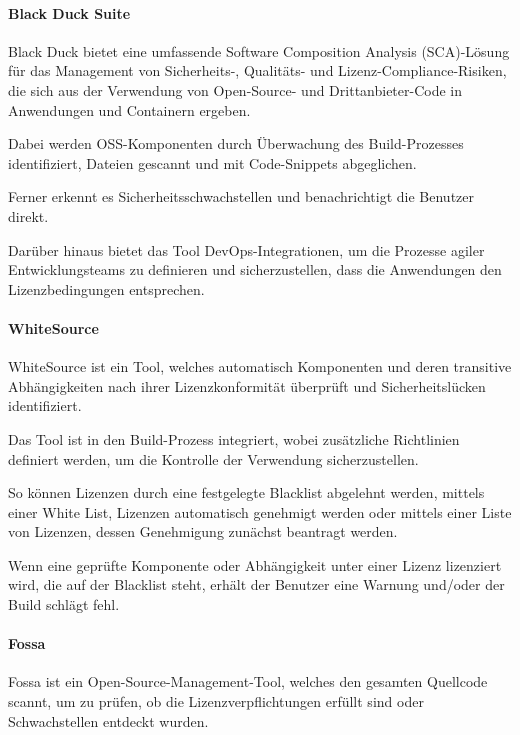 \paragraph{Black Duck Suite}

Black Duck bietet eine umfassende Software Composition Analysis (SCA)-Lösung für das Management von Sicherheits-, Qualitäts- und Lizenz-Compliance-Risiken, die sich aus der Verwendung von Open-Source- und Drittanbieter-Code in Anwendungen und Containern ergeben. \cite{}

Dabei werden OSS-Komponenten durch Überwachung des Build-Prozesses identifiziert, Dateien gescannt und mit Code-Snippets abgeglichen. 

Ferner erkennt es Sicherheitsschwachstellen und benachrichtigt die Benutzer direkt. 

Darüber hinaus bietet das Tool DevOps-Integrationen, um die Prozesse agiler Entwicklungsteams zu definieren und sicherzustellen, dass die Anwendungen den Lizenzbedingungen entsprechen.

\paragraph{WhiteSource}

WhiteSource ist ein Tool, welches automatisch Komponenten und deren transitive Abhängigkeiten nach ihrer Lizenzkonformität überprüft und Sicherheitslücken identifiziert. \cite{}  

Das Tool ist in den Build-Prozess integriert, wobei zusätzliche Richtlinien definiert werden, um die Kontrolle der Verwendung sicherzustellen. 

So können Lizenzen durch eine festgelegte Blacklist abgelehnt werden, mittels einer White List, Lizenzen automatisch genehmigt werden oder mittels einer Liste von Lizenzen, dessen Genehmigung zunächst beantragt werden. 

Wenn eine geprüfte Komponente oder Abhängigkeit unter einer Lizenz lizenziert wird, die auf der Blacklist steht, erhält der Benutzer eine Warnung und/oder der Build schlägt fehl.

\paragraph{Fossa}

Fossa ist ein Open-Source-Management-Tool, welches den gesamten Quellcode scannt, um zu prüfen, ob die Lizenzverpflichtungen erfüllt sind oder Schwachstellen entdeckt wurden. \cite{} 

